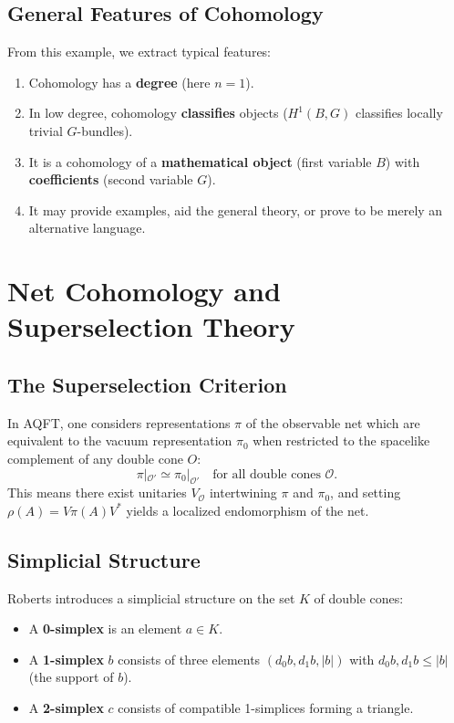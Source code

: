 \documentclass[11pt,a4paper]{article}
\begin{document}
\subsection{General Features of Cohomology}

From this example, we extract typical features:
\begin{enumerate}[nosep]
  \item Cohomology has a \textbf{degree} (here $n=1$).
  \item In low degree, cohomology \textbf{classifies} objects
        ($H^1(B,G)$ classifies locally trivial $G$-bundles).
  \item It is a cohomology of a \textbf{mathematical object} (first variable $B$)
        with \textbf{coefficients} (second variable $G$).
  \item It may provide examples, aid the general theory, or prove to be
        merely an alternative language.
\end{enumerate}

\section{Net Cohomology and Superselection Theory}

\subsection{The Superselection Criterion}

In AQFT, one considers representations $\pi$ of the observable net which
are equivalent to the vacuum representation $\pi_0$ when restricted to
the spacelike complement of any double cone $O$:
\begin{equation}
  \pi|_{\mathcal{O}'} \simeq \pi_0|_{\mathcal{O}'}
  \quad\text{for all double cones } \mathcal{O}.
\end{equation}
This means there exist unitaries $V_\mathcal{O}$ intertwining $\pi$ and $\pi_0$,
and setting $\rho(A) = V\pi(A)V^*$ yields a localized endomorphism of the net.

\subsection{Simplicial Structure}

Roberts introduces a simplicial structure on the set $K$ of double cones:
\begin{itemize}[nosep]
  \item A \textbf{0-simplex} is an element $a \in K$.
  \item A \textbf{1-simplex} $b$ consists of three elements $(d_0 b, d_1 b, |b|)$
        with $d_0 b, d_1 b \leq |b|$ (the support of $b$).
  \item A \textbf{2-simplex} $c$ consists of compatible 1-simplices forming a triangle.
\end{itemize}
\end{document}
